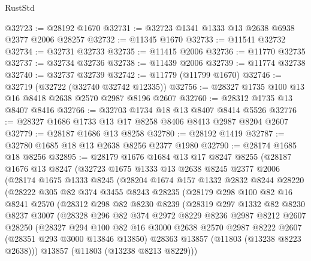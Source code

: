 \begin{lexlean}{RustStd}
\begin{coremodule}
@32723 := @28192 @1670
@32731 := @32723 @1341 @1333 @13 @2638 @6938 @2377 @2006 @28257
@32732 := @11345 @1670
@32733 := @11541 @32732
@32734 := @32731 @32733
@32735 := @11415 @2006
@32736 := @11770 @32735
@32737 := @32734 @32736
@32738 := @11439 @2006
@32739 := @11774 @32738
@32740 := @32737 @32739
@32742 := @11779 (@11799 @1670)
@32746 := @32719 (@32722 (@32740 @32742 @12335))
@32756 := @28327 @1735 @100 @13 @16 @8418 @2638 @2570 @2987 @8196 @2607
@32760 := @28312 @1735 @13 @8407 @8416
@32766 := @32703 @1734 @18 @13 @8407 @8414 @5526
@32776 := @28327 @1686 @1733 @13 @17 @8258 @8406 @8413 @2987 @8204 @2607
@32779 := @28187 @1686 @13 @8258
@32780 := @28192 @1419
@32787 := @32780 @1685 @18 @13 @2638 @8256 @2377 @1980
@32790 := @28174 @1685 @18 @8256
@32895 := @28179
    @1676
    @1684
    @13
    @17
    @8247
    @8255
    (@28187
      @1676
      @13
      @8247
      (@32723
        @1675
        @1333
        @13
        @2638
        @8245
        @2377
        @2006
        (@28174
          @1675
          @1333
          @8245
          (@28204
            @1674
            @157
            @1332
            @2832
            @8244
            @28220
            (@28222
              @305
              @82
              @374
              @3455
              @8243
              @28235
              (@28179
                @298
                @100
                @82
                @16
                @8241
                @2570
                (@28312
                  @298
                  @82
                  @8230
                  @8239
                  (@28319
                    @297
                    @1332
                    @82
                    @8230
                    @8237
                    @3007
                    (@28328
                      @296
                      @82
                      @374
                      @2972
                      @8229
                      @8236
                      @2987
                      @8212
                      @2607
                      @28250
                      (@28327
                        @294
                        @100
                        @82
                        @16
                        @3000
                        @2638
                        @2570
                        @2987
                        @8222
                        @2607
                        (@28351 @293 @3000 @13846 @13850)
                        @28363
                        @13857
                        (@11803 (@13238 @8223 @2638)))
                      @13857
                      (@11803 (@13238 @8213 @8229)))

\end{coremodule}
\end{lexlean}
